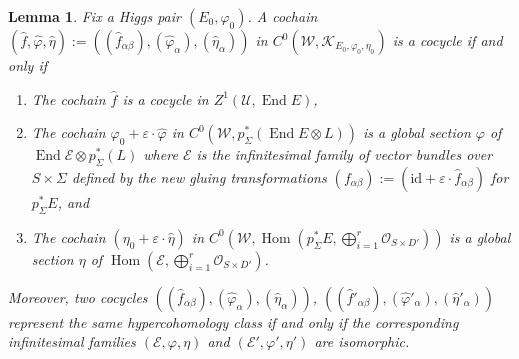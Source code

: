 \documentclass[12pt,a4paper,oneside,english]{smfart}
\newtheorem{lem}[thm]{Lemma}
\theoremstyle{definition}
\theoremstyle{remark}
\DeclareMathOperator{\End}{End}
\DeclareMathOperator{\Hom}{Hom}
\newcommand{\cO}{\mathcal{O}}
\newcommand{\cE}{\mathcal{E}}
\newcommand{\KK}{\mathscr{K}}
\begin{document}
\begin{lem}\label{t7.4}
Fix a Higgs pair $(E_0, \varphi_0)$. A cochain $(\hat{f}, \hat{\varphi}, \hat{\eta}) := ((\hat{f}_{\alpha \beta}), (\hat{\varphi}_\alpha), (\hat{\eta}_\alpha))$ in $C^0(\mathcal{W}, \KK_{E_0, \varphi_0, \eta_0})$ is a cocycle if and only if
\begin{enumerate}
    \item The cochain $\hat{f}$ is a cocycle in $Z^1(\mathcal{U}, \End E)$,
    \item The cochain $\varphi_0 + \varepsilon \cdot \hat{\varphi}$ in $C^0(\mathcal{W}, p_\Sigma^*(\End E \otimes L))$ is a global section $\varphi$ of $\End \cE \otimes p_\Sigma^*(L)$ where $\cE$ is the infinitesimal family of vector bundles over $S \times \Sigma$ defined by the new gluing transformations $(f_{\alpha \beta}) := (\mathrm{id} + \varepsilon \cdot \hat{f}_{\alpha \beta})$ for $p_\Sigma^* E$, and
    \item The cochain $(\eta_0 + \varepsilon \cdot \hat{\eta})$ in $C^0(\mathcal{W}, \Hom(p_\Sigma^* E, \bigoplus_{i=1}^{r} \cO_{S \times D'}))$ is a global section $\eta$ of $\Hom(\cE, \bigoplus_{i=1}^{r} \cO_{S \times D'})$.
\end{enumerate}
Moreover, two cocycles $((\hat{f}_{\alpha \beta}), (\hat{\varphi}_\alpha), (\hat{\eta}_\alpha))$, $((\hat{f}'_{\alpha \beta}), (\hat{\varphi}'_\alpha), (\hat{\eta}'_\alpha))$ represent the same hypercohomology class if and only if the corresponding infinitesimal families $(\cE, \varphi, \eta)$ and $(\cE', \varphi', \eta')$ are isomorphic.
\end{lem}
\end{document}
